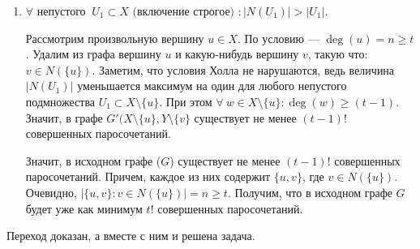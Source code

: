 \begin{solution}
\begin{enumerate}
    \item $\forall \text{ непустого } \ U_1 \subset X \text{ (включение строгое) } : |N(U_1)| > |U_1|$.\par
    Рассмотрим произвольную вершину $u \in X$. По условию --- $\operatorname{deg}(u) = n \geq t$. Удалим из графа вершину $u$ и какую-нибудь вершину $v$, такую что: $v \in N(\{u\})$. Заметим, что условия Холла не нарушаются, ведь величина \\ $|N(U_1)|$ уменьшается максимум на один для любого непустого подмножества $U_1 \subset X \setminus \{u\}$. При этом $\forall \ w \in X \setminus \{u\} : \operatorname{deg}(w) \geq (t - 1)$. Значит, в графе $G'(X \setminus \{u\}, Y \setminus \{v\} $ существует не менее $(t - 1)!$ совершенных паросочетаний.\par
    Значит, в исходном графе ($G$) существует не менее $(t - 1)!$ совершенных паросочетаний. Причем, каждое из них содержит $\{u, v\}$, где $v \in N(\{u\})$. \\ Очевидно, $|{\{u, v\} : v \in N(\{u\})}| = n \geq t$. Получим, что в исходном графе $G$ будет уже как минимум $t!$ совершенных паросочетаний.
\end{enumerate}
Переход доказан, а вместе с ним и решена задача.

\end{solution}\par
